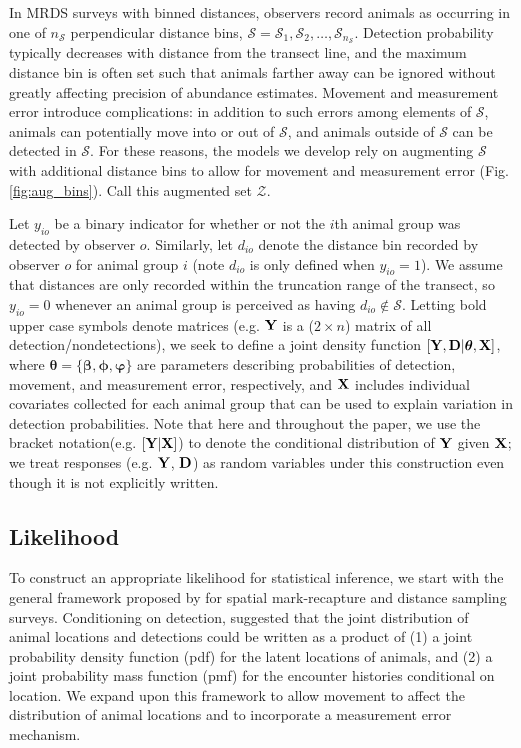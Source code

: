 \documentclass[aoas,preprint]{imsart}
\numberwithin{equation}{section}
\theoremstyle{plain}
\begin{document}
In MRDS surveys with binned distances, observers record animals as occurring in one of $n_\mathcal{S}$ perpendicular distance bins, $\mathcal{S} = \mathcal{S}_1,\mathcal{S}_2,\hdots,\mathcal{S}_{n_\mathcal{S}}$.  Detection probability typically decreases with distance from the transect line, and the maximum distance bin is often set such that animals farther away can be ignored without greatly affecting precision of abundance estimates.  Movement and measurement error introduce complications: in addition to such errors among elements of $\mathcal{S}$, animals can potentially move into or out of $\mathcal{S}$, and animals outside of $\mathcal{S}$ can be detected in $\mathcal{S}$.  For these reasons, the models we develop rely on augmenting $\mathcal{S}$ with additional distance bins to allow for movement and measurement error (Fig. \ref{fig:aug_bins}).  Call this augmented set $\mathcal{Z}$.

Let $y_{io}$ be a binary indicator for whether or not the $i$th animal group was detected by observer $o$.  Similarly, let $d_{io}$ denote the distance bin recorded by observer $o$ for animal group $i$ (note $d_{io}$ is only defined when $y_{io}=1$). We assume that distances are only recorded within the truncation range of the transect, so $y_{io}=0$ whenever an animal group is perceived as having $d_{io} \notin \mathcal{S}$.  Letting bold upper case symbols denote matrices (e.g. ${\bf Y}$ is a ($2 \times n$) matrix of all detection/nondetections),  we seek to define a joint density function $[{\bf Y},{\bf D}|\boldsymbol{\theta},{\bf X}]$, where $\boldsymbol{\theta}= \{ \boldsymbol{\beta,\phi,\varphi} \}$ are parameters describing probabilities of detection, movement, and measurement error, respectively, and ${\bf X}$ includes individual covariates collected for each animal group that can be used to explain variation in detection probabilities.  Note that here and throughout the paper, we use the bracket notation(e.g.  $[\textbf{Y}|\textbf{X}]$) to denote the conditional distribution of $\textbf{Y}$ given $\textbf{X}$; we treat responses (e.g. $\textbf{Y}$, $\textbf{D}$) as random variables under this construction even though it is not explicitly written.

\subsection{Likelihood}

To construct an appropriate likelihood for statistical inference, we start with the general framework proposed by \citet{BorchersEtAl2015} for spatial mark-recapture and distance sampling surveys.  Conditioning on detection, \citet{BorchersEtAl2015} suggested that the joint distribution of animal locations and detections could be written as a product of (1) a joint probability density function (pdf) for the latent locations of animals, and (2) a joint probability mass function (pmf) for the encounter histories conditional on location.  We expand upon this framework to allow movement to affect the distribution of animal locations and to incorporate a measurement error mechanism.
\end{document}
